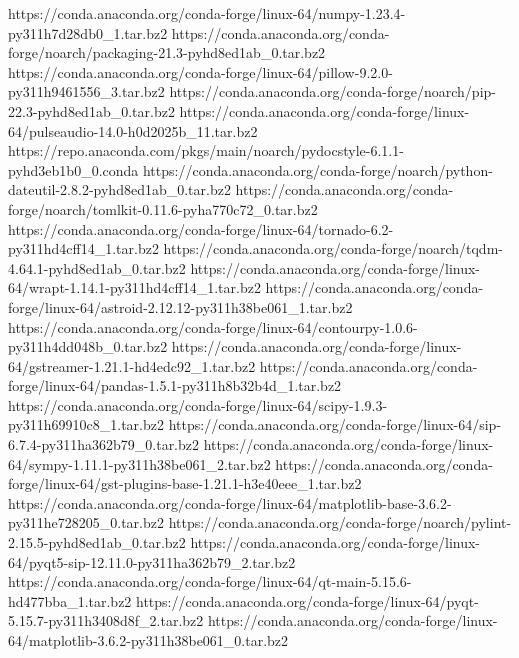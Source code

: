 https://conda.anaconda.org/conda-forge/linux-64/numpy-1.23.4-py311h7d28db0_1.tar.bz2
https://conda.anaconda.org/conda-forge/noarch/packaging-21.3-pyhd8ed1ab_0.tar.bz2
https://conda.anaconda.org/conda-forge/linux-64/pillow-9.2.0-py311h9461556_3.tar.bz2
https://conda.anaconda.org/conda-forge/noarch/pip-22.3-pyhd8ed1ab_0.tar.bz2
https://conda.anaconda.org/conda-forge/linux-64/pulseaudio-14.0-h0d2025b_11.tar.bz2
https://repo.anaconda.com/pkgs/main/noarch/pydocstyle-6.1.1-pyhd3eb1b0_0.conda
https://conda.anaconda.org/conda-forge/noarch/python-dateutil-2.8.2-pyhd8ed1ab_0.tar.bz2
https://conda.anaconda.org/conda-forge/noarch/tomlkit-0.11.6-pyha770c72_0.tar.bz2
https://conda.anaconda.org/conda-forge/linux-64/tornado-6.2-py311hd4cff14_1.tar.bz2
https://conda.anaconda.org/conda-forge/noarch/tqdm-4.64.1-pyhd8ed1ab_0.tar.bz2
https://conda.anaconda.org/conda-forge/linux-64/wrapt-1.14.1-py311hd4cff14_1.tar.bz2
https://conda.anaconda.org/conda-forge/linux-64/astroid-2.12.12-py311h38be061_1.tar.bz2
https://conda.anaconda.org/conda-forge/linux-64/contourpy-1.0.6-py311h4dd048b_0.tar.bz2
https://conda.anaconda.org/conda-forge/linux-64/gstreamer-1.21.1-hd4edc92_1.tar.bz2
https://conda.anaconda.org/conda-forge/linux-64/pandas-1.5.1-py311h8b32b4d_1.tar.bz2
https://conda.anaconda.org/conda-forge/linux-64/scipy-1.9.3-py311h69910c8_1.tar.bz2
https://conda.anaconda.org/conda-forge/linux-64/sip-6.7.4-py311ha362b79_0.tar.bz2
https://conda.anaconda.org/conda-forge/linux-64/sympy-1.11.1-py311h38be061_2.tar.bz2
https://conda.anaconda.org/conda-forge/linux-64/gst-plugins-base-1.21.1-h3e40eee_1.tar.bz2
https://conda.anaconda.org/conda-forge/linux-64/matplotlib-base-3.6.2-py311he728205_0.tar.bz2
https://conda.anaconda.org/conda-forge/noarch/pylint-2.15.5-pyhd8ed1ab_0.tar.bz2
https://conda.anaconda.org/conda-forge/linux-64/pyqt5-sip-12.11.0-py311ha362b79_2.tar.bz2
https://conda.anaconda.org/conda-forge/linux-64/qt-main-5.15.6-hd477bba_1.tar.bz2
https://conda.anaconda.org/conda-forge/linux-64/pyqt-5.15.7-py311h3408d8f_2.tar.bz2
https://conda.anaconda.org/conda-forge/linux-64/matplotlib-3.6.2-py311h38be061_0.tar.bz2
